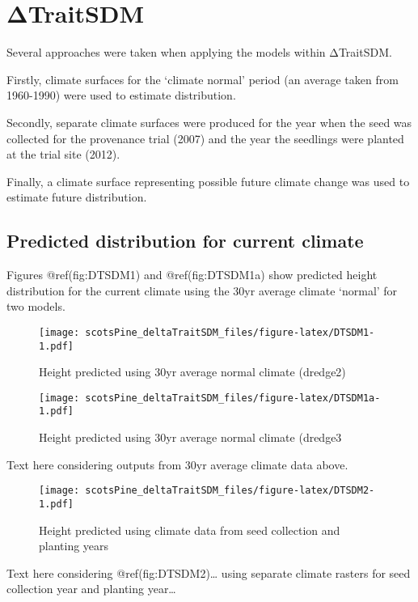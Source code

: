 \documentclass[]{article}
\begin{document}
\section{ΔTraitSDM}\label{ux3b4traitsdm}

Several approaches were taken when applying the models within ΔTraitSDM.

Firstly, climate surfaces for the `climate normal' period (an average
taken from 1960-1990) were used to estimate distribution.

Secondly, separate climate surfaces were produced for the year when the
seed was collected for the provenance trial (2007) and the year the
seedlings were planted at the trial site (2012).

Finally, a climate surface representing possible future climate change
was used to estimate future distribution.

\subsection{Predicted distribution for current
climate}\label{predicted-distribution-for-current-climate}

Figures @ref(fig:DTSDM1) and @ref(fig:DTSDM1a) show predicted height
distribution for the current climate using the 30yr average climate
`normal' for two models.

\begin{figure}
\centering
\texttt{[image: scotsPine\_deltaTraitSDM\_files/figure-latex/DTSDM1-1.pdf]}
\caption{Height predicted using 30yr average normal climate (dredge2)}
\end{figure}

\begin{figure}
\centering
\texttt{[image: scotsPine\_deltaTraitSDM\_files/figure-latex/DTSDM1a-1.pdf]}
\caption{Height predicted using 30yr average normal climate (dredge3}
\end{figure}

Text here considering outputs from 30yr average climate data above.

\begin{figure}
\centering
\texttt{[image: scotsPine\_deltaTraitSDM\_files/figure-latex/DTSDM2-1.pdf]}
\caption{Height predicted using climate data from seed collection and
planting years}
\end{figure}

Text here considering @ref(fig:DTSDM2)\ldots{} using separate climate
rasters for seed collection year and planting year\ldots{}
\end{document}
